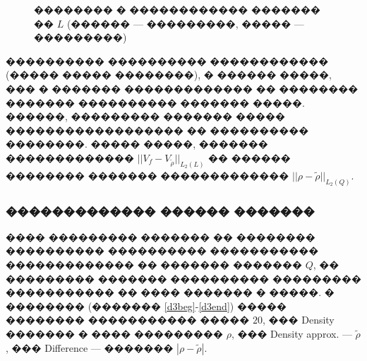 \documentclass[a4paper]{article}
\begin{document}
\begin{figure}[h]
  \vfill
  \caption{�������� � ������������ ������� �� $L$ (������ --- ���������, ����� --- ���������)}
  \label{hexampl}
\end{figure}

���������� ���������� ������������ (����� ����� ��������), � ������ �����, ��� � ������� ������������� �� �������� ������� ���������� ������� �����.
������, ��������� ������� ����� ������������������ �� ���������� ��������.
����� �����, ������� ������������� $||V_f-V_{\tilde{\rho} } ||_{L_2(L)}$ �� ������ �������� ������� ������������� $||\rho-\tilde{\rho} ||_{L_2(Q)}$.%

\FloatBarrier
\subsubsection{������������� ������ �������}
���� ��������� ������� �� �������� ���������� ���������� ����������� ������������� �� ������� ������� $Q$, �� ��������� ������� ���������� ��������� ����������� �� ���� ������� � �����.
� �������� (������� \ref{d3beg}-\ref{d3end}) ����� �������� ����������� ����� $20$, ��� Density ������� � ���� ��������� $\rho$, ��� Density approx. --- $\tilde{\rho}$, ��� Difference --- ������� $|\rho-\tilde{\rho}|$.
\end{document}
